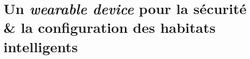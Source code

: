 \chapter{Un \textit{wearable device} pour la sécurité \& la configuration des habitats intelligents}
\label{chap:5}

